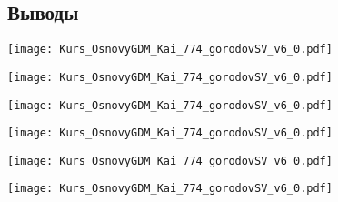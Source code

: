 \documentclass[main.tex]{subfiles}
\begin{document}
\subsection{Выводы}

\texttt{[image: Kurs\_OsnovyGDM\_Kai\_774\_gorodovSV\_v6\_0.pdf]}

\texttt{[image: Kurs\_OsnovyGDM\_Kai\_774\_gorodovSV\_v6\_0.pdf]}

\texttt{[image: Kurs\_OsnovyGDM\_Kai\_774\_gorodovSV\_v6\_0.pdf]}

\texttt{[image: Kurs\_OsnovyGDM\_Kai\_774\_gorodovSV\_v6\_0.pdf]}

\texttt{[image: Kurs\_OsnovyGDM\_Kai\_774\_gorodovSV\_v6\_0.pdf]}

\texttt{[image: Kurs\_OsnovyGDM\_Kai\_774\_gorodovSV\_v6\_0.pdf]}
\end{document}
